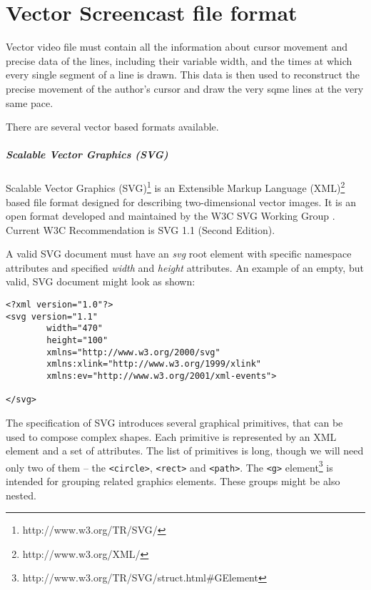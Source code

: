 \chapter{Vector Screencast file format}

Vector video file must contain all the information about cursor movement and precise data of the lines, including their variable width, and the times at which every single segment of a line is drawn. This data is then used to reconstruct the precise movement of the author's cursor and draw the very sqme lines at the very same pace.

There are several vector based formats available.

\paragraph{Scalable Vector Graphics (SVG)}
Scalable Vector Graphics (SVG)\footnote{http://www.w3.org/TR/SVG/} is an Extensible Markup Language (XML)\footnote{http://www.w3.org/XML/} based file format designed for describing two-dimensional vector images. It is an open format developed and maintained by the W3C SVG Working Group \cite{}. Current W3C Recommendation is SVG 1.1 (Second Edition).

A valid SVG document must have an \textit{svg} root element with specific namespace attributes and specified \textit{width} and \textit{height} attributes. An example of an empty, but valid, SVG document might look as shown:

\begin{verbatim}
<?xml version="1.0"?>
<svg version="1.1"
        width="470"
        height="100"
        xmlns="http://www.w3.org/2000/svg"
        xmlns:xlink="http://www.w3.org/1999/xlink"
        xmlns:ev="http://www.w3.org/2001/xml-events">

</svg>
\end{verbatim}

The specification of SVG introduces several graphical primitives, that can be used to compose complex shapes. Each primitive is represented by an XML element and a set of attributes. The list of primitives is long, though we will need only two of them -- the \verb|<circle>|, \verb|<rect>| and \verb|<path>|. The \verb|<g>| element\footnote{http://www.w3.org/TR/SVG/struct.html\#GElement} is intended for grouping related graphics elements. These groups might be also nested.